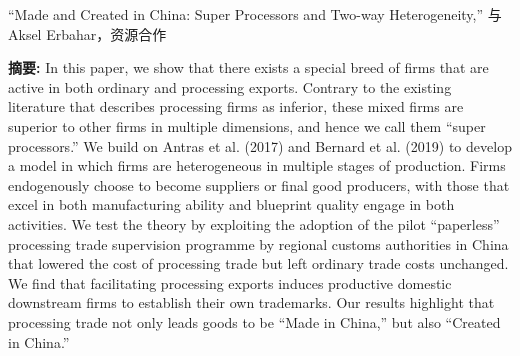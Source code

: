 \documentclass[letterpaper]{article}
\begin{document}
{ “Made and Created in China: Super Processors and Two-way Heterogeneity,” 与Aksel Erbahar，资源合作
   \vspace{0.05in}
 \begin{center}
 \begin{minipage}{0.9\linewidth}
   \textbf{摘要:} In this paper, we show that there exists a special breed of firms that are active in both ordinary and processing exports. Contrary to the existing literature that describes processing firms as inferior, these mixed firms are superior to other firms in multiple dimensions, and hence we call them “super processors.” We build on Antras et al. (2017) and Bernard et al. (2019) to develop a model in which firms are heterogeneous in multiple stages of production. Firms endogenously choose to become suppliers or final good producers, with those that excel in both manufacturing ability and blueprint quality engage in both activities. We test the theory by exploiting the adoption of the pilot “paperless” processing trade supervision programme by regional customs authorities in China that lowered the cost of processing trade but left ordinary trade costs unchanged. We find that facilitating processing exports induces productive domestic downstream firms to establish their own trademarks. Our results highlight that processing trade not only leads goods to be “Made in China,” but also “Created in China.”
 \end{minipage}
 \end{center}


}
\end{document}
